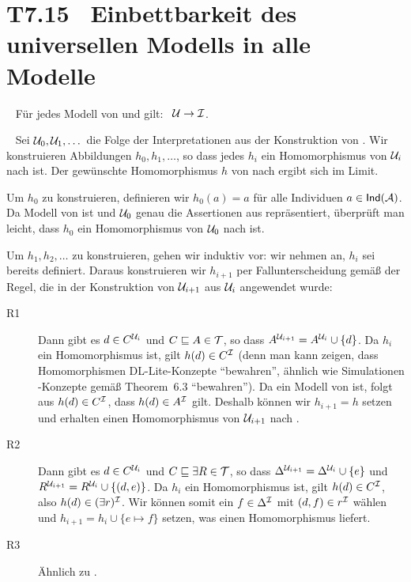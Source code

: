 \documentclass[fontsize=11pt, twoside=false, numbers=autoenddot]{scrbook}
\begin{document}
\pagebreak
\section*{T7.15~ Einbettbarkeit des universellen Modells in alle Modelle}

~
Für jedes Modell \Imc von \Amc und \Tmc gilt:~ $\mathcal{U} \rightarrow \mathcal{I}$.

\parII
{}~
Sei $\mathcal{U}_0,\mathcal{U}_1,\dots$ die Folge der Interpretationen
aus der Konstruktion von \Umc.
Wir konstruieren Abbildungen $h_0,h_1,\dots$, so dass jedes $h_i$
ein Homomorphismus von $\mathcal{U}_i$ nach \Imc ist.
Der gewünschte Homomorphismus $h$ von \Umc nach \Imc ergibt sich im Limit.

Um $h_0$ zu konstruieren, definieren wir $h_0(a) = a$ für alle Individuen
$a \in \textsf{Ind}(\mathcal{A})$.
Da \Imc Modell von \Amc ist und $\mathcal{U}_0$ genau die Assertionen aus \Amc
repräsentiert, überprüft man leicht, dass $h_0$ ein Homomorphismus
von $\mathcal{U}_0$ nach \Imc ist.

Um $h_1,h_2,\dots$ zu konstruieren, gehen wir induktiv vor:
wir nehmen an, $h_i$ sei bereits definiert.
Daraus konstruieren wir $h_{i+1}$ per Fallunterscheidung gemäß
der Regel, die in der
Konstruktion von $\mathcal{U}_{i+1}$ aus $\mathcal{U}_i$
angewendet wurde:
%
\begin{description}
  \item[\textsf{R1}]
    Dann gibt es $d \in C^{\mathcal{U}_i}$ und $C \sqsubseteq A \in \mathcal{T}$,
    so dass $A^{\mathcal{U}_{i+1}} = A^{\mathcal{U}_i} \cup \{d\}$.
    Da $h_i$ ein Homomorphismus ist, gilt $h(d) \in C^{\mathcal{I}}$
    (denn man kann zeigen,
    dass Homomorphismen DL-Lite-Konzepte "`bewahren"',
    ähnlich wie Simulationen \EL-Konzepte gemäß Theorem~6.3 "`bewahren"').
    Da \Imc ein Modell von \Tmc ist, folgt aus 
    $h(d) \in C^{\mathcal{I}}$, dass $h(d) \in A^{\mathcal{I}}$ gilt.
    Deshalb können wir $h_{i+1} = h$ setzen und erhalten einen Homomorphismus
    von $\mathcal{U}_{i+1}$ nach \Imc.
  \item[\textsf{R2}]
    Dann gibt es $d \in C^{\mathcal{U}_i}$ und $C \sqsubseteq \exists R \in \mathcal{T}$,
    so dass $\Delta^{\mathcal{U}_{i+1}} = \Delta^{\mathcal{U}_i} \cup \{e\}$
    und $R^{\mathcal{U}_{i+1}} = R^{\mathcal{U}_i} \cup \{(d,e)\}$.
    Da $h_i$ ein Homomorphismus ist, gilt $h(d) \in C^{\mathcal{I}}$,
    also $h(d) \in (\exists r)^{\mathcal{I}}$.
    Wir können somit ein $f \in \Delta^{\mathcal{I}}$ mit $(d,f) \in r^\mathcal{I}$ wählen
    und $h_{i+1} = h_i \cup \{e \mapsto f\}$ setzen, was einen Homomorphismus liefert.
  \item[\textsf{R3}]
    Ähnlich zu .
    \qedhere
\end{description}
\end{document}
